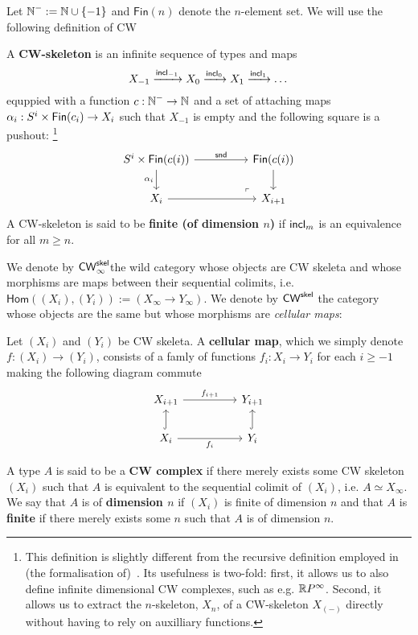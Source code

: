 \documentclass[a4page]{article}
\begin{document}
Let $\textsf{$\mathbb{N}$}^{-} := \textsf{$\mathbb{N}$} \cup \{-1\}$ and $\mathsf{Fin}(n)$ denote the $n$-element set. We will use the following definition of CW
\begin{definition}[CW skeleta]
  A \textbf{CW-skeleton} is an infinite sequence of types and maps
  \[X_{-1} \xrightarrow{\textnormal{\ensuremath{\mathsf{incl}_{-1}}}} X_0 \xrightarrow{\textnormal{\ensuremath{\mathsf{incl}_{0}}}} X_1 \xrightarrow{\textnormal{\ensuremath{\mathsf{incl}_{1}}}} \dots \]
  equppied with a function $c : \textsf{$\mathbb{N}$}^- \to \textsf{$\mathbb{N}$}$ and a set of attaching maps $\alpha_i : S^i \times \textnormal{\ensuremath{\mathsf{Fin}({c_i})}} \to X_i$ such that $X_{-1}$ is empty and the following square is a pushout:
  \footnote{This definition is slightly different from the
  recursive definition employed in (the formalisation
  of)~\cite{BuchholtzFavonia18}. Its usefulness is two-fold: first, it
  allows us to also define infinite dimensional CW complexes, such as
  e.g. $\textnormal{\ensuremath{\mathbb{R}P^\infty}}$. Second, it allows us to extract the $n$-skeleton,
  $X_n$, of a CW-skeleton $X_{(-)}$ directly without having to rely on
  auxilliary functions.}
  \[
\begin{tikzcd}[ampersand replacement=\&]
	{S^{i} \times \fin{c(i)}} \&\& \fin{c(i)} \\
	{X_i} \&\& {X_{i+1}}
	\arrow["{\mathsf{snd}}", from=1-1, to=1-3]
	\arrow["{\alpha_{i}}"', from=1-1, to=2-1]
	\arrow[from=2-1, to=2-3]
	\arrow[from=1-3, to=2-3]
	\arrow["\lrcorner"{anchor=center, pos=0.125, rotate=180}, draw=none, from=2-3, to=1-1]
\end{tikzcd}
\]
A CW-skeleton is said to be \textbf{finite (of dimension $n$)} if $\textnormal{\ensuremath{\mathsf{incl}_{m}}}$ is an equivalence for all $m \geq n$.
\end{definition}
We denote by $\textnormal{\ensuremath{\mathsf{CW}_\infty^{\mathsf{skel}}}}$the wild category whose objects are CW skeleta and whose morphisms are maps between their sequential colimits, i.e. $\mathsf{Hom}((X_i),(Y_i)) := (X_\infty \to Y_\infty)$. We denote by $\textnormal{\ensuremath{\mathsf{CW}^{\mathsf{skel}}}}$ the category whose objects are the same but whose morphisms are \emph{cellular maps}:
\begin{definition}
  Let $(X_i)$ and $(Y_i)$ be CW skeleta. A \textbf{cellular map}, which we simply denote $f : (X_i) \to (Y_i)$, consists of a famly of functions $f_i : X_i \to Y_i$ for each $i \geq -1$ making the following diagram commute
  \[
\begin{tikzcd}[ampersand replacement=\&]
	{X_{i+1}} \&\& {Y_{i+1}} \\
	{X_i} \&\& {Y_i}
	\arrow["{f_{i+1}}", from=1-1, to=1-3]
	\arrow["{f_{i}}"', from=2-1, to=2-3]
	\arrow[hook, from=2-1, to=1-1]
	\arrow[hook, from=2-3, to=1-3]
\end{tikzcd}
\]
\end{definition}
\begin{definition}[CW complexes]
  A type $A$ is said to be a \textbf{CW complex} if there merely exists some CW skeleton $(X_i)$ such that $A$ is equivalent to the sequential colimit of $(X_i)$, i.e. $A \simeq X_\infty$. We say that $A$ is of \textbf{dimension $n$} if $(X_i)$ is finite of dimension $n$ and that $A$ is \textbf{finite} if there merely exists some $n$ such that $A$ is of dimension $n$.
\end{definition}
\end{document}
